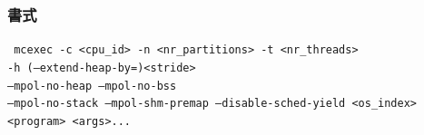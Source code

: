 \documentclass[twoside,11pt,fleqn]{book}
\begin{document}
\subsubsection*{書式}{\quad} 
\texttt{
mcexec
 {\lbrack}-c <cpu\_id>{\rbrack}
 {\lbrack}-n <nr\_partitions>{\rbrack}
 {\lbrack}-t <nr\_threads>{\rbrack}\\
 {\lbrack}-h (--extend-heap-by=)<stride>{\rbrack}}\\
\texttt{{\lbrack}--mpol-no-heap{\rbrack}
 {\lbrack}--mpol-no-bss{\rbrack}\\
 {\lbrack}--mpol-no-stack{\rbrack}
 {\lbrack}--mpol-shm-premap{\rbrack}
 {\lbrack}--disable-sched-yield{\rbrack}
 {\lbrack}<os\_index>{\rbrack}\\
 <program> {\lbrack}<args>...{\rbrack}
}
\end{document}
